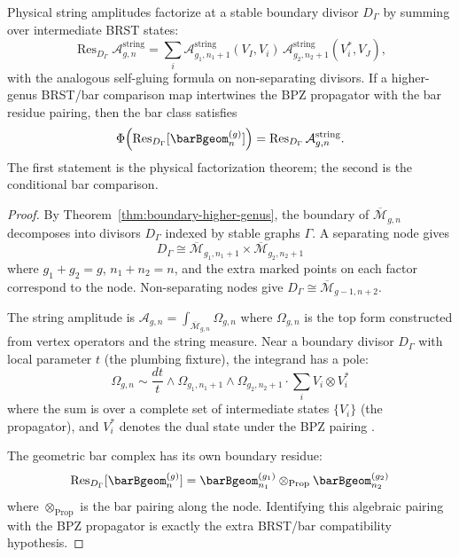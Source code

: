 \begin{theorem}\label{thm:amplitude-factorization}
Physical string amplitudes factorize at a stable boundary divisor
$D_\Gamma$ by summing over intermediate BRST states:
\[
\operatorname{Res}_{D_\Gamma}\mathcal{A}_{g,n}^{\mathrm{string}}
=
\sum_i
\mathcal{A}_{g_1,n_1+1}^{\mathrm{string}}(V_I,V_i)\,
\mathcal{A}_{g_2,n_2+1}^{\mathrm{string}}(V_i^*,V_J),
\]
with the analogous self-gluing formula on non-separating divisors.
If a higher-genus BRST/bar comparison map intertwines the BPZ
propagator with the bar residue pairing, then the bar class satisfies
\[
\Phi\!\left(
\operatorname{Res}_{D_\Gamma}[\barBgeom^{(g)}_n]
\right)
=
\operatorname{Res}_{D_\Gamma}\mathcal{A}_{g,n}^{\mathrm{string}}.
\]
The first statement is the physical factorization theorem; the second
is the conditional bar comparison.
\end{theorem}

\begin{proof}
By Theorem~\ref{thm:boundary-higher-genus}, the boundary of
$\overline{\mathcal{M}}_{g,n}$ decomposes into divisors $D_\Gamma$
indexed by stable graphs $\Gamma$. A separating node gives
\[
D_\Gamma \cong \overline{\mathcal{M}}_{g_1, n_1+1} \times \overline{\mathcal{M}}_{g_2, n_2+1}
\]
where $g_1 + g_2 = g$, $n_1 + n_2 = n$, and the extra marked points on each factor correspond to the node. Non-separating nodes give $D_\Gamma \cong \overline{\mathcal{M}}_{g-1, n+2}$.

The string amplitude is $\mathcal{A}_{g,n} = \int_{\overline{\mathcal{M}}_{g,n}} \Omega_{g,n}$ where $\Omega_{g,n}$ is the top form constructed from vertex operators and the string measure. Near a boundary divisor $D_\Gamma$ with local parameter $t$ (the plumbing fixture), the integrand has a pole:
\[
\Omega_{g,n} \sim \frac{dt}{t} \wedge \Omega_{g_1, n_1+1} \wedge \Omega_{g_2, n_2+1} \cdot \sum_i V_i \otimes V_i^*
\]
where the sum is over a complete set of intermediate states $\{V_i\}$ (the propagator), and $V_i^*$ denotes the dual state under the BPZ pairing \cite{BPZ84}.

The geometric bar complex has its own boundary residue:
\[
\operatorname{Res}_{D_\Gamma}[\barBgeom^{(g)}_n] = \barBgeom^{(g_1)}_{n_1} \otimes_{\mathrm{Prop}} \barBgeom^{(g_2)}_{n_2}
\]
where $\otimes_{\mathrm{Prop}}$ is the bar pairing along the node.
Identifying this algebraic pairing with the BPZ propagator is exactly
the extra BRST/bar compatibility hypothesis.
\end{proof}

